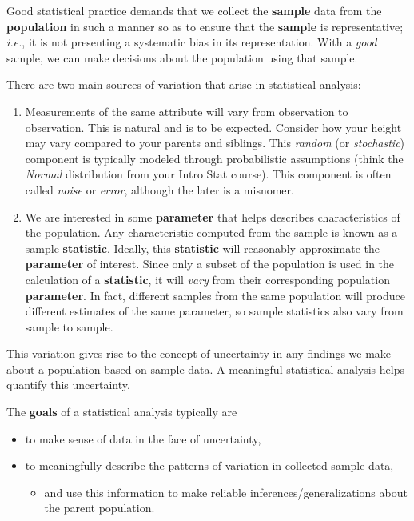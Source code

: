 \documentclass[
]{book}
\providecommand{\tightlist}{%
  \setlength{\itemsep}{0pt}\setlength{\parskip}{0pt}}
\begin{document}
Good statistical practice demands that we collect the \textbf{sample} data from the \textbf{population} in such a manner so as to ensure that the \textbf{sample} is representative; \emph{i.e.}, it is not presenting a systematic bias in its representation. With a \emph{good} sample, we can make decisions about the population using that sample.

There are two main sources of variation that arise in statistical analysis:

\begin{enumerate}
\def\labelenumi{\arabic{enumi}.}
\item
  Measurements of the same attribute will vary from observation to observation. This is natural and is to be expected. Consider how your height may vary compared to your parents and siblings. This \emph{random} (or \emph{stochastic}) component is typically modeled through probabilistic assumptions (think the \emph{Normal} distribution from your Intro Stat course). This component is often called \emph{noise} or \emph{error}, although the later is a misnomer.
\item
  We are interested in some \textbf{parameter} that helps describes characteristics of the population. Any characteristic computed from the sample is known as a sample \textbf{statistic}. Ideally, this \textbf{statistic} will reasonably approximate the \textbf{parameter} of interest. Since only a subset of the population is used in the calculation of a \textbf{statistic}, it will \emph{vary} from their corresponding population \textbf{parameter}. In fact, different samples from the same population will produce different estimates of the same parameter, so sample statistics also vary from sample to sample.
\end{enumerate}

This variation gives rise to the concept of uncertainty in any findings we make about a population based on sample data. A meaningful statistical analysis helps quantify this uncertainty.

The \textbf{goals} of a statistical analysis typically are

\begin{itemize}
\tightlist
\item
  to make sense of data in the face of uncertainty,
\item
  to meaningfully describe the patterns of variation in collected sample data,

  \begin{itemize}
  \tightlist
  \item
    and use this information to make reliable inferences/generalizations about the parent population.
  \end{itemize}
\end{itemize}
\end{document}

